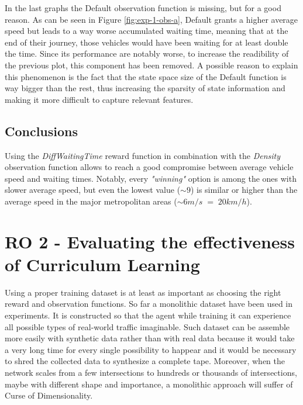 In the last graphs the Default observation function is missing, but for a good reason.
As can be seen in Figure \ref{fig:exp-1-obs-a}, Default grants a higher average speed but leads to a way worse accumulated waiting time, meaning that at the end of their journey, those vehicles would have been waiting for at least double the time.
Since its performance are notably worse, to increase the readibility of the previous plot, this component has been removed.
A possible reason to explain this phenomenon is the fact that the state space size of the Default function is way bigger than the rest, thus increasing the sparsity of state information and making it more difficult to capture relevant features.



\subsection{Conclusions}

Using the \textit{DiffWaitingTime} reward function in combination with the \textit{Density} observation function allows to reach a good compromise between average vehicle speed and waiting times.
Notably, every \textit{"winning"} option is among the ones with slower average speed, but even the lowest value ($\sim9$) is similar or higher than the average speed in the major metropolitan areas ($\sim 6 m/s \; = \; 20 km/h$).

\section{RO 2 - Evaluating the effectiveness of Curriculum Learning}

Using a proper training dataset is at least as important as choosing the right reward and observation functions.
So far a monolithic dataset have been used in experiments.
It is constructed so that the agent while training it can experience all possible types of real-world traffic imaginable.
Such dataset can be assemble more easily with synthetic data rather than with real data because it would take a very long time for every single possibility to happear and it would be necessary to shred the collected data to synthesize a complete tape.
Moreover, when the network scales from a few intersections to hundreds or thousands of intersections, maybe with different shape and importance, a monolithic approach will suffer of Curse of Dimensionality.

